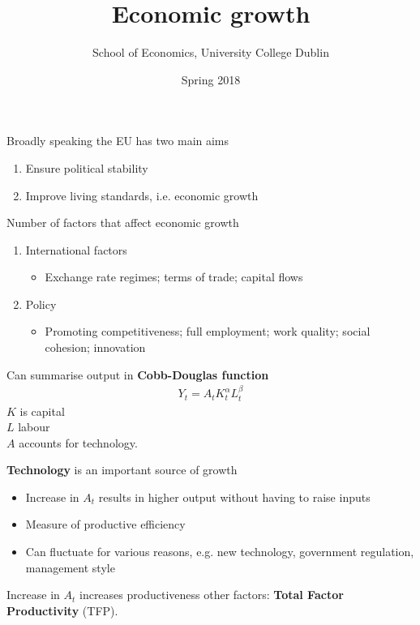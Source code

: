 \documentclass{beamer}
\title{Economic growth}
\author{School of Economics, University College Dublin}
\date{Spring 2018}
\begin{document}
\begin{frame}
 \titlepage
\end{frame}

\begin{frame}
  Broadly speaking the EU has two main aims
  \begin{enumerate}
    \item Ensure political stability
    \item Improve living standards, i.e. economic growth
  \end{enumerate}
\end{frame}

\begin{frame}
  Number of factors that affect economic growth
  \begin{enumerate}
    \item International factors
    \begin{itemize}
      \item Exchange rate regimes; terms of trade; capital flows
    \end{itemize}
    \medskip
    \item Policy
    \begin{itemize}
      \item Promoting competitiveness; full employment; work quality; social cohesion; innovation
    \end{itemize}
  \end{enumerate}
\end{frame}

\begin{frame}
 Can summarise output in \textbf{Cobb-Douglas function}\\ 
\begin{align}
  Y_t=A_tK^{\alpha}_tL^{\beta}_t
\end{align}
$K$ is capital\\
$L$ labour\\
$A$ accounts for technology. 
\end{frame}

\begin{frame}
 \textbf{Technology} is an important source of growth 
\begin{itemize}
  \item Increase in $A_t$ results in higher output without having to raise inputs
  \item Measure of productive efficiency
  \item Can fluctuate for various reasons, e.g. new technology, government regulation, management style
\end{itemize}
 \medskip
  Increase in $A_t$ increases productiveness other factors: \textbf{Total Factor Productivity} (TFP).
\end{frame}
\end{document}

